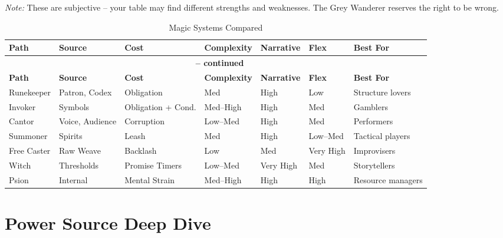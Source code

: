\documentclass[10pt,a5paper]{book}
\begin{document}
\medskip
\noindent \textit{Note:} These are subjective -- your table may find different strengths and weaknesses. The Grey Wanderer reserves the right to be wrong.

\vspace{0.5cm}

\small
\begin{longtable}{p{2cm} p{2cm} p{1.5cm} p{1.5cm} p{1.5cm} p{1.5cm} p{2cm}}
\caption{Magic Systems Compared}\\
\toprule
\textbf{Path} & \textbf{Source} & \textbf{Cost} & \textbf{Complexity} & \textbf{Narrative} & \textbf{Flex} & \textbf{Best For} \\
\midrule
\endfirsthead
\multicolumn{7}{c}{{\bfseries \tablename\ \thetable{} -- continued}} \\
\toprule
\textbf{Path} & \textbf{Source} & \textbf{Cost} & \textbf{Complexity} & \textbf{Narrative} & \textbf{Flex} & \textbf{Best For} \\
\midrule
\endhead
\bottomrule
\endfoot
Runekeeper & Patron, Codex & Obligation & Med & High & Low & Structure lovers \\
Invoker & Symbols & Obligation + Cond. & Med--High & High & Med & Gamblers \\
Cantor & Voice, Audience & Corruption & Low--Med & High & Med & Performers \\
Summoner & Spirits & Leash & Med & High & Low--Med & Tactical players \\
Free Caster & Raw Weave & Backlash & Low & Med & Very High & Improvisers \\
Witch & Thresholds & Promise Timers & Low--Med & Very High & Med & Storytellers \\
Psion & Internal & Mental Strain & Med--High & High & High & Resource managers \\
\bottomrule
\end{longtable}
\normalsize

\section*{Power Source Deep Dive}
\end{document}
